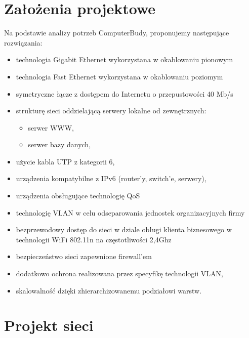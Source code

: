 \documentclass{report}
\begin{document}
\chapter{Założenia projektowe}

Na podstawie analizy potrzeb ComputerBudy, proponujemy
następujące rozwiązania:

\begin{itemize}

\item{technologia Gigabit Ethernet wykorzystana w okablowaniu pionowym}

\item{technologia Fast Ethernet wykorzystana w okablowaniu poziomym}

\item{symetryczne łącze z dostępem do Internetu o przepustowości 40 Mb/s}

\item{strukturę sieci oddzielającą serwery lokalne od zewnętrznych:
 \begin{itemize}
\item serwer WWW,
\item serwer bazy danych,
\end{itemize}}

\item {użycie kabla UTP z kategorii 6,}

\item {urządzenia kompatybilne z IPv6 (router’y, switch’e, serwery),}

\item {urządzenia obsługujące technologię QoS}

\item{technologię VLAN w celu odseparowania jednostek organizacyjnych firmy}

\item{bezprzewodowy dostęp do sieci w dziale obługi klienta biznesowego w technologii WiFi
802.11n na częstotliwości 2,4Ghz}

\item{bezpieczeństwo sieci zapewnione firewall’em}

\item{dodatkowo ochrona realizowana przez specyfikę technologii VLAN,}

\item{skalowalność dzięki zhierarchizowanemu podziałowi warstw.}

\end{itemize}


\chapter{Projekt sieci}
\end{document}
